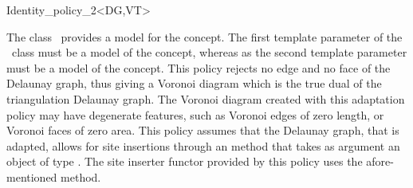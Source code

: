 

\begin{ccRefClass}{Identity_policy_2<DG,VT>}


\ccDefinition

The class \ccRefName\ provides a model for the 
concept. The first template parameter of the \ccRefName\ class must be a
model of the  concept, whereas as the second
template parameter must be a model of the  concept.
This policy rejects no edge and no face of the Delaunay graph, thus
giving a Voronoi diagram which is the true dual of the triangulation
Delaunay graph. The Voronoi diagram created with this adaptation
policy may have degenerate features, such as Voronoi edges of zero
length, or Voronoi faces of zero area. This policy assumes that the
Delaunay graph, that is adapted, allows for site insertions through an
 method that takes as argument an object of type
. The site inserter functor provided by this policy
uses the afore-mentioned  method.



\ccIsModel
{}

\ccTypes
{}

\ccSeeAlso
{}\\
\\
\end{ccRefClass}


